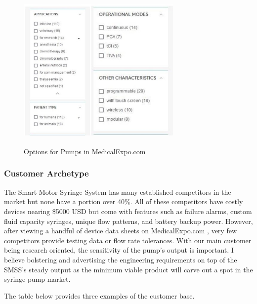 \documentclass[journal]{IEEEtran}
\begin{document}
            \begin{figure}[H]
                \centering
                \includegraphics[width=8cm, height=8cm]{Images/options_search.jpg}
                \caption{Options for Pumps in MedicalExpo.com \cite{goog_device}}
                \label{fig:search_option}
            \end{figure}
            
            
            
        \subsubsection{Customer Archetype}
            The Smart Motor Syringe System has many established competitors in the market but none have a portion over 40\%. All of these competitors have costly devices nearing \$5000 USD but come with features such as failure alarms, custom fluid capacity syringes, unique flow patterns, and battery backup power. However, after viewing a handful of device data sheets on MedicalExpo.com \cite{goog_device}, very few competitors provide testing data or flow rate tolerances. With our main customer being research oriented, the sensitivity of the pump's output is important. I believe bolstering and advertising the engineering requirements on top of the SMSS's steady output as the minimum viable product will carve out a spot in the syringe pump market.
            
            The table below provides three examples of the customer base.
            
\end{document}
